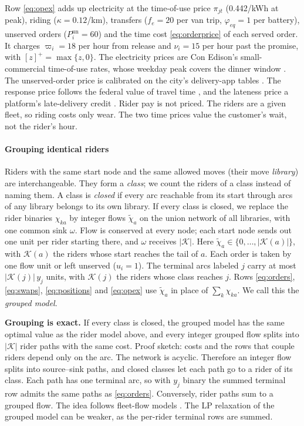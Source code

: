 Row \eqref{eq:opex} adds up electricity at the time-of-use price $\pi_{jt}$ (0.442\usd{}/kWh at peak), riding ($\kappa=0.12$\usd{}/km), transfers ($f_e=20$\usd{} per van trip, $\varphi_{eq}=1$\usd{} per battery), unserved orders ($P^{\mathrm{un}}_i=60$\usd{}) and the time cost \eqref{eq:orderprice} of each served order. It charges $\varpi_i=18$\usd{} per hour from release and $\nu_i=15$\usd{} per hour past the promise, with $[z]^+=\max\{z,0\}$. The electricity prices are Con Edison's small-commercial time-of-use rates, whose weekday peak covers the dinner window \cite{coned2026tou}. The unserved-order price is calibrated on the city's delivery-app tables \cite{dcwp2026quarterly}. The response price follows the federal value of travel time \cite{usdot2016vtts}, and the lateness price a platform's late-delivery credit \cite{doordash2026premium}. Rider pay is not priced. The riders are a given fleet, so riding costs only wear. The two time prices value the customer's wait, not the rider's hour.

\paragraph*{Grouping identical riders}\label{sec:model:agg}
Riders with the same start node and the same allowed moves (their move \emph{library}) are interchangeable. They form a \emph{class}; we count the riders of a class instead of naming them. A class is \emph{closed} if every arc reachable from its start through arcs of any library belongs to its own library. If every class is closed, we replace the rider binaries $\chi_{ka}$ by integer flows $\tilde\chi_a$ on the union network of all libraries, with one common sink $\omega$. Flow is conserved at every node; each start node sends out one unit per rider starting there, and $\omega$ receives $|\mathcal K|$. Here $\tilde\chi_a\in\{0,\dots,|\mathcal K(a)|\}$, with $\mathcal K(a)$ the riders whose start reaches the tail of $a$. Each order is taken by one flow unit or left unserved ($u_i=1$). The terminal arcs labeled $j$ carry at most $|\mathcal K(j)|\,y_j$ units, with $\mathcal K(j)$ the riders whose class reaches $j$. Rows \eqref{eq:orders}, \eqref{eq:swaps}, \eqref{eq:positions} and \eqref{eq:opex} use $\tilde\chi_a$ in place of $\sum_k\chi_{ka}$. We call this the \emph{grouped model}.\par\noindent\textbf{Grouping is exact.} If every class is closed, the grouped model has the same optimal value as the rider model above, and every integer grouped flow splits into $|\mathcal K|$ rider paths with the same cost. Proof sketch: costs and the rows that couple riders depend only on the arc. The network is acyclic. Therefore an integer flow splits into source--sink paths, and closed classes let each path go to a rider of its class. Each path has one terminal arc, so with $y_j$ binary the summed terminal row admits the same paths as \eqref{eq:orders}. Conversely, rider paths sum to a grouped flow. The idea follows fleet-flow models \cite{luke2021joint}. The LP relaxation of the grouped model can be weaker, as the per-rider terminal rows are summed.

